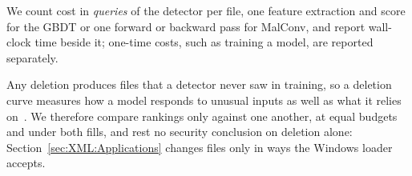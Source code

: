 We count cost in \emph{queries} of the detector per file, one feature extraction and score for the GBDT or one
forward or backward pass for MalConv, and report wall-clock time beside it; one-time costs, such as training a model,
are reported separately.

Any deletion produces files that a detector never saw in training, so a deletion curve measures how a model responds
to unusual inputs as well as what it relies on~\cite{rong2022consistent}. We therefore compare rankings only against one another, at equal
budgets and under both fills, and rest no security conclusion on deletion alone: Section~\ref{sec:XML:Applications}
changes files only in ways the Windows loader accepts.
